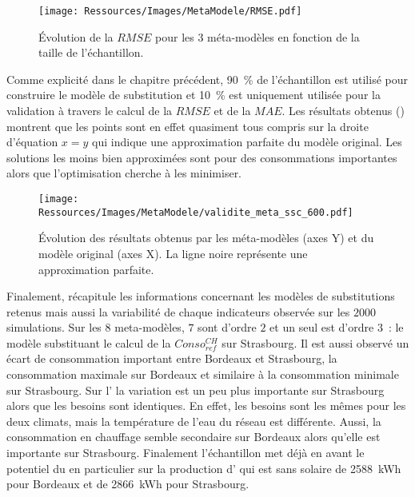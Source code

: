 \begin{figure}
    \centering
    \texttt{[image: Ressources/Images/MetaModele/RMSE.pdf]}
    \caption[Évolution de la $RMSE$ en fonction de l’échantillon]
            {Évolution de la $RMSE$ pour les \num{3} méta-modèles
             en fonction de la taille de l’échantillon.}
    \label{fig:rmse_mae}
\end{figure}

Comme explicité dans le chapitre précédent, \SI{90}{\percent} de l’échantillon est utilisé
pour construire le modèle de substitution et \SI{10}{\percent} est uniquement
utilisée pour la validation à travers le calcul de la $RMSE$ et de la $MAE$.
Les résultats obtenus () montrent que les points sont en
effet quasiment tous compris sur la droite d’équation $x = y$ qui indique une approximation
parfaite du modèle original. Les solutions les moins bien approximées sont pour des
consommations importantes alors que l’optimisation cherche à les minimiser.

\begin{figure}
    \centering
    \texttt{[image: Ressources/Images/MetaModele/validite\_meta\_ssc\_600.pdf]}
    \caption[Évaluation de la précision des méta-modèles pour les solutions de l’échantillon]
            {Évolution des résultats obtenus par les méta-modèles (axes Y) et du modèle
             original (axes X). La ligne noire représente une approximation parfaite.}
    \label{fig:validite_meta_ssc}
\end{figure}

Finalement,  récapitule les informations concernant les modèles
de substitutions retenus mais aussi la variabilité de chaque indicateurs observée sur les
$2000$ simulations. Sur les $8$ meta-modèles, $7$ sont d’ordre $2$ et un seul est d’ordre
$3$~: le modèle substituant le calcul de la $Conso_{ref}^{CH}$ sur Strasbourg. Il est
aussi observé un écart de consommation important entre Bordeaux et Strasbourg, la
consommation maximale sur Bordeaux et similaire à la consommation minimale sur Strasbourg.
Sur l’ la variation est un peu plus importante sur Strasbourg alors que les
besoins sont identiques. En effet, les besoins sont les mêmes pour les deux climats, mais
la température de l’eau du réseau est différente. Aussi, la consommation
en chauffage semble secondaire sur Bordeaux alors qu’elle est importante sur Strasbourg.
Finalement l’échantillon met déjà en avant le potentiel du  en particulier sur
la production d’ qui est sans solaire de \SI{2588}{kWh} pour Bordeaux
et de \SI{2866}{kWh} pour Strasbourg.

